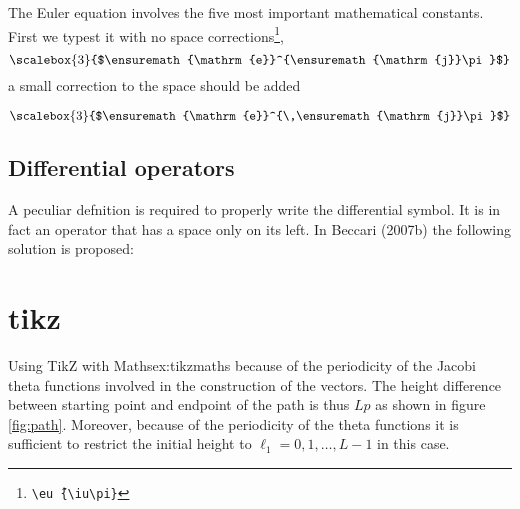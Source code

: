 {

The Euler equation involves the five most important mathematical constants. First we typest it with no space corrections\footnote{\texttt{\textbackslash eu\^\,\{\textbackslash iu\textbackslash pi\}}},
\providecommand*{\eu}%
{\ensuremath{\mathrm{e}}}
\providecommand*{\iu}%
{\ensuremath{\mathrm{j}}}
\[\scalebox{3}{$\eu^{\iu\pi}$}\]
a small correction to the space should be added

\[\scalebox{3}{$\eu^{\,\iu\pi}$}\]

\subsection{Differential operators}
A peculiar defnition is required to properly
write the differential symbol. It is in fact an operator that has a space only on its left. In Beccari (2007b) the following solution is proposed:

\bigskip


\clearpage
\section{tikz}
\begin{texexample}{Using TikZ with Maths}{ex:tikzmaths}
because of the periodicity of the Jacobi theta functions involved in the construction of the vectors.
The height difference between starting point and endpoint of the path is thus $Lp$ as shown in figure \ref{fig:path}. Moreover, because of the periodicity of the theta functions it is sufficient to restrict the initial height to $\ell_1=0,1,\dots,L-1$ in this case.

{  \centering
}
  

\end{texexample}}
